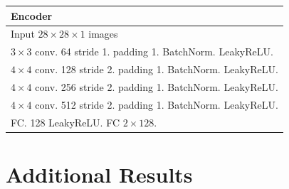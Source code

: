 \begin{table}[!t]
\begin{subtable}[h]{\textwidth}
    \centering
        \begin{tabular}{|l|}
        \toprule
        \textbf{Encoder}  \\
        \midrule
        Input $28\times28\times1$ images  \\
        \hline 
        $3\times3$ conv. 64 stride 1. padding 1. BatchNorm. LeakyReLU. \\
        \hline 
        $4\times4$ conv. 128 stride 2. padding 1. BatchNorm. LeakyReLU. \\
        \hline 
        $4\times4$ conv. 256 stride 2. padding 1. BatchNorm. LeakyReLU. \\
        \hline
        $4\times4$ conv. 512  stride 2. padding 1. BatchNorm. LeakyReLU.  \\
        \hline
        FC. 128 LeakyReLU. FC $2\times128$. \\
        \bottomrule
        \end{tabular}
    \vspace*{1ex}
    \end{subtable}
    \label{app:tab:arch-gans}
\end{table}






\newpage
\section{Additional Results}
\label{app:sec:additional-results}

